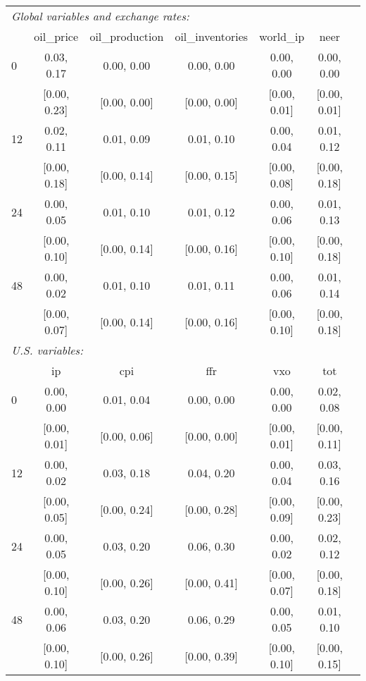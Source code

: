 \begin{tabular}{lcccccc}\toprule\midrule  
\multicolumn{6}{l}{\textit{Global variables and exchange rates:}} \\ 
 & oil_price & oil_production & oil_inventories & world_ip & neer  \\ \midrule  
 0 & 0.03,    0.17 & 0.00,    0.00 & 0.00,    0.00 & 0.00,    0.00 & 0.00,    0.00 \\  
 & [0.00,    0.23] & [0.00,    0.00] & [0.00,    0.00] & [0.00,    0.01] & [0.00,    0.01] \\  
 12 & 0.02,    0.11 & 0.01,    0.09 & 0.01,    0.10 & 0.00,    0.04 & 0.01,    0.12 \\  
 & [0.00,    0.18] & [0.00,    0.14] & [0.00,    0.15] & [0.00,    0.08] & [0.00,    0.18] \\  
 24 & 0.00,    0.05 & 0.01,    0.10 & 0.01,    0.12 & 0.00,    0.06 & 0.01,    0.13 \\  
 & [0.00,    0.10] & [0.00,    0.14] & [0.00,    0.16] & [0.00,    0.10] & [0.00,    0.18] \\  
 48 & 0.00,    0.02 & 0.01,    0.10 & 0.01,    0.11 & 0.00,    0.06 & 0.01,    0.14 \\  
 & [0.00,    0.07] & [0.00,    0.14] & [0.00,    0.16] & [0.00,    0.10] & [0.00,    0.18] \\[2ex] \midrule  
\multicolumn{6}{l}{\textit{U.S. variables:}} \\ 
 & ip & cpi & ffr & vxo & tot  \\ \midrule  
 0 & 0.00,    0.00 & 0.01,    0.04 & 0.00,    0.00 & 0.00,    0.00 & 0.02,    0.08 \\  
 & [0.00,    0.01] & [0.00,    0.06] & [0.00,    0.00] & [0.00,    0.01] & [0.00,    0.11] \\  
 12 & 0.00,    0.02 & 0.03,    0.18 & 0.04,    0.20 & 0.00,    0.04 & 0.03,    0.16 \\  
 & [0.00,    0.05] & [0.00,    0.24] & [0.00,    0.28] & [0.00,    0.09] & [0.00,    0.23] \\  
 24 & 0.00,    0.05 & 0.03,    0.20 & 0.06,    0.30 & 0.00,    0.02 & 0.02,    0.12 \\  
 & [0.00,    0.10] & [0.00,    0.26] & [0.00,    0.41] & [0.00,    0.07] & [0.00,    0.18] \\  
 48 & 0.00,    0.06 & 0.03,    0.20 & 0.06,    0.29 & 0.00,    0.05 & 0.01,    0.10 \\  
 & [0.00,    0.10] & [0.00,    0.26] & [0.00,    0.39] & [0.00,    0.10] & [0.00,    0.15] \\  
\midrule\bottomrule 
\end{tabular}
